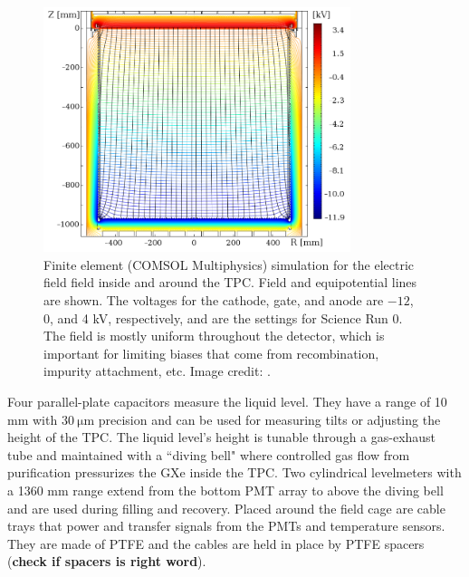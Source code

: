 \egroup

\begin{figure}
\centering
\includegraphics[width=0.8\textwidth]{ElectricField}
\caption{Finite element (COMSOL Multiphysics) simulation for the electric field field inside and around the TPC.  Field and equipotential
lines are
shown.  The voltages for the cathode, gate, and anode are $-12$, 0, and 4 kV, respectively, and are the settings for Science Run 0.  The
field is mostly uniform throughout the detector, which is important for limiting biases that come from recombination, impurity attachment,
etc.  Image credit: .}
\label{fig:xenon1t_tpc_efield}
\end{figure}

Four parallel-plate capacitors measure the liquid level.  They have a range of 10 mm with $30\ \mathrm{\mu m}$ precision and can be used
for measuring tilts or adjusting the height of the TPC.  The liquid level's height is tunable through a gas-exhaust tube and maintained
with a ``diving bell" where controlled gas flow from purification pressurizes the GXe inside the TPC.  Two cylindrical levelmeters
with a 1360 mm range extend from the bottom PMT array to above the diving bell and are used during filling and recovery.  Placed around
the field cage are cable trays that power and transfer signals from the PMTs and temperature sensors.  They are made of PTFE and the
cables are held in place by PTFE spacers (\textbf{check if spacers is right word}).



